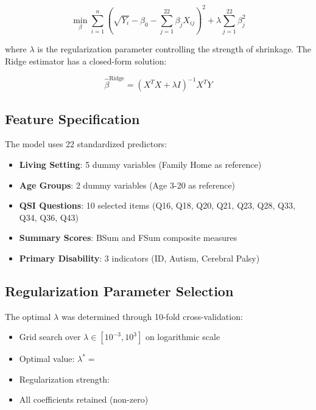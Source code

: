 \begin{equation}
\min_{\beta} \sum_{i=1}^n \left(\sqrt{Y_i} - \beta_0 - \sum_{j=1}^{22} \beta_j X_{ij}\right)^2 + \lambda \sum_{j=1}^{22} \beta_j^2
\end{equation}

where $\lambda$ is the regularization parameter controlling the strength of shrinkage. The Ridge estimator has a closed-form solution:

\begin{equation}
\hat{\beta}^{\text{Ridge}} = (X^TX + \lambda I)^{-1}X^TY
\end{equation}

\subsection{Feature Specification}

The model uses 22 standardized predictors:
\begin{itemize}
    \item \textbf{Living Setting}: 5 dummy variables (Family Home as reference)
    \item \textbf{Age Groups}: 2 dummy variables (Age 3-20 as reference)
    \item \textbf{QSI Questions}: 10 selected items (Q16, Q18, Q20, Q21, Q23, Q28, Q33, Q34, Q36, Q43)
    \item \textbf{Summary Scores}: BSum and FSum composite measures
    \item \textbf{Primary Disability}: 3 indicators (ID, Autism, Cerebral Palsy)
\end{itemize}

\subsection{Regularization Parameter Selection}

The optimal $\lambda$ was determined through 10-fold cross-validation:
\begin{itemize}
    \item Grid search over $\lambda \in [10^{-3}, 10^{3}]$ on logarithmic scale
    \item Optimal value: $\lambda^* = $ \ModelFiveAlpha{}
    \item Regularization strength: \ModelFiveRegularizationStrength{}
    \item All \ModelFiveNumNonZero{} coefficients retained (non-zero)
\end{itemize}

